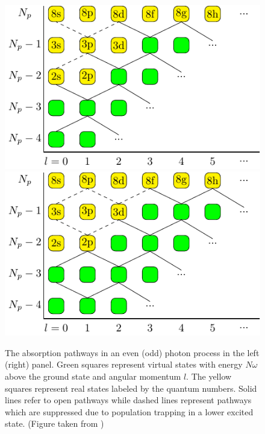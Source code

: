 \begin{figure}[!ht]
\centering
\includegraphics[width=0.49\columnwidth]{figs/Rydberg/l_fig_even.pdf}
\includegraphics[width=0.49\columnwidth]{figs/Rydberg/l_fig_odd.pdf}
\caption{
The absorption pathways in an even (odd) photon process in the left (right) panel. Green squares represent virtual states with energy $N\omega$ above the ground state and angular momentum $l$. The yellow squares represent real states labeled by the quantum numbers. Solid lines refer to open pathways while dashed lines represent pathways which are suppressed due to population trapping in a lower excited state. (Figure taken from \cite{venzke2018_ryd})
}
\label{fig:pathways_ryd_linear}
\end{figure}


